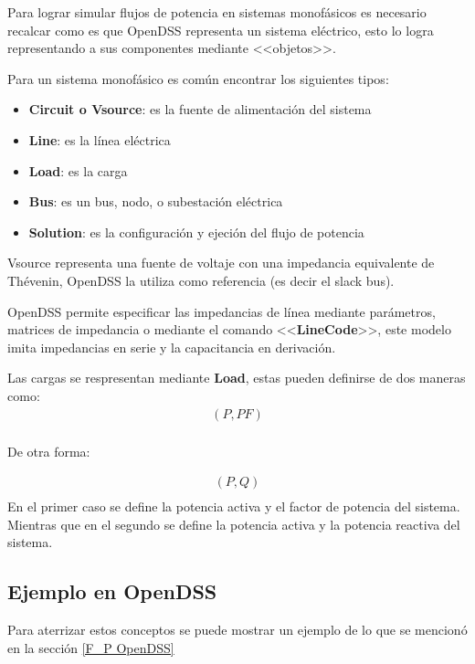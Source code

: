 \documentclass[11pt, letterpaper]{article}
\begin{document}
Para lograr simular flujos de potencia en sistemas monofásicos es necesario recalcar como es que OpenDSS representa un sistema eléctrico, esto lo logra
representando a sus componentes mediante <<objetos>>.

Para un sistema monofásico es común encontrar los siguientes tipos:

\begin{itemize}
    \item \textbf{Circuit o Vsource}: es la fuente de alimentación del sistema
    \item \textbf{Line}: es la línea eléctrica
    \item \textbf{Load}: es la carga
    \item \textbf{Bus}: es un bus, nodo, o subestación eléctrica
    \item \textbf{Solution}: es la configuración y ejeción del flujo de potencia
\end{itemize}

Vsource representa una fuente de voltaje con una impedancia equivalente de Thévenin, OpenDSS la utiliza como referencia (es decir el slack bus).

OpenDSS permite especificar las impedancias de línea mediante parámetros, matrices de impedancia o mediante el comando <<\textbf{LineCode}>>, este modelo
imita impedancias en serie y la capacitancia en derivación.

Las cargas se respresentan mediante \textbf{Load}, estas pueden definirse de dos maneras como:
\begin{align*}
    (P, PF) \\
\end{align*}
\begin{center}
    De otra forma:
\end{center}
\begin{align*}
    (P, Q) \\
\end{align*}
En el primer caso se define la potencia activa y el factor de potencia del sistema.
Mientras que en el segundo se define la potencia activa y la potencia reactiva del sistema.

\subsection{Ejemplo en OpenDSS}

Para aterrizar estos conceptos se puede mostrar un ejemplo de lo que se mencionó en la sección \ref{F_P OpenDSS}
\end{document}
